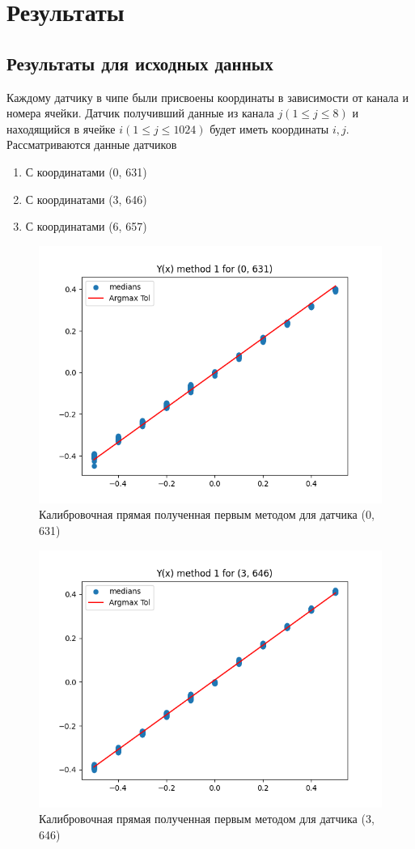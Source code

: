 \section{Результаты}

\subsection{Результаты для исходных данных}

Каждому датчику в чипе были присвоены координаты в зависимости от канала и номера ячейки. Датчик получивший данные из канала $j(1 \leq j \leq 8)$ и находящийся в ячейке $i(1 \leq j \leq 1024)$ будет иметь координаты $i, j$. Рассматриваются данные датчиков

\begin{enumerate}
    \item С координатами (0, 631)
    \item С координатами (3, 646)
    \item С координатами (6, 657)
\end{enumerate}

\begin{figure}[H]
    \centering
    \includegraphics[width=0.7\linewidth]{image/0_631_method_1.png}
    \caption{Калибровочная прямая полученная первым методом для датчика (0, 631)}
    \label{fig:0_631_method_1}
\end{figure}

\begin{figure}[H]
    \centering
    \includegraphics[width=0.7\linewidth]{image/3_646_method_1.png}
    \caption{Калибровочная прямая полученная первым методом для датчика (3, 646)}
    \label{fig:3_646_method_1}
\end{figure}

